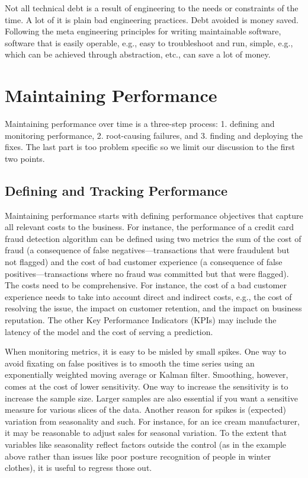 \documentclass[12pt, letterpaper]{article}
\begin{document}
Not all technical debt is a result of engineering to the needs or constraints of the time. A lot of it is plain bad engineering practices. Debt avoided is money saved. Following the meta engineering principles for writing maintainable software, software that is easily operable, e.g., easy to troubleshoot and run, simple, e.g., which can be achieved through abstraction, etc., can save a lot of money. 

\section{Maintaining Performance}
Maintaining performance over time is a three-step process: 1. defining and monitoring performance, 2. root-causing failures, and 3. finding and deploying the fixes. The last part is too problem specific so we limit our discussion to the first two points.

\subsection{Defining and Tracking Performance}
Maintaining performance starts with defining performance objectives that capture all relevant costs to the business. For instance, the performance of a credit card fraud detection algorithm can be defined using two metrics the sum of the cost of fraud (a consequence of false negatives—transactions that were fraudulent but not flagged) and the cost of bad customer experience (a consequence of false positives—transactions where no fraud was committed but that were flagged).  The costs need to be comprehensive. For instance, the cost of a bad customer experience needs to take into account direct and indirect costs, e.g., the cost of resolving the issue, the impact on customer retention, and the impact on business reputation. The other Key Performance Indicators (KPIs) may include the latency of the model and the cost of serving a prediction.

When monitoring metrics, it is easy to be misled by small spikes. One way to avoid fixating on false positives is to smooth the time series using an exponentially weighted moving average or Kalman filter. Smoothing, however, comes at the cost of lower sensitivity. One way to increase the sensitivity is to increase the sample size. Larger samples are also essential if you want a sensitive measure for various slices of the data. Another reason for spikes is (expected) variation from seasonality and such. For instance, for an ice cream manufacturer, it may be reasonable to adjust sales for seasonal variation. To the extent that variables like seasonality reflect factors outside the control (as in the example above rather than issues like poor posture recognition of people in winter clothes), it is useful to regress those out. 
\end{document}
